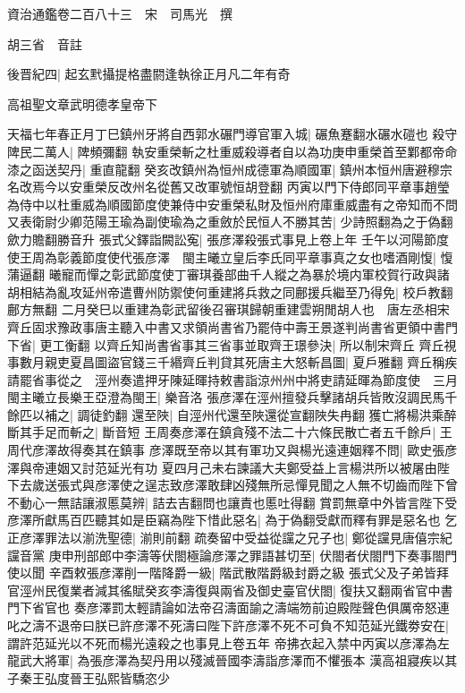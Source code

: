 資治通鑑卷二百八十三　宋　司馬光　撰

胡三省　音註

後晋紀四|{
	起玄黓攝提格盡閼逢執徐正月凡二年有奇}


高祖聖文章武明德孝皇帝下

天福七年春正月丁巳鎮州牙將自西郭水碾門導官軍入城|{
	碾魚蹇翻水碾水磑也}
殺守陴民二萬人|{
	陴頻彌翻}
執安重榮斬之杜重威殺導者自以為功庚申重榮首至鄴都帝命漆之函送契丹|{
	重直龍翻}
癸亥改鎮州為恒州成德軍為順國軍|{
	鎮州本恒州唐避穆宗名改焉今以安重榮反改州名從舊又改軍號恒胡登翻}
丙寅以門下侍郎同平章事趙瑩為侍中以杜重威為順國節度使兼侍中安重榮私財及恒州府庫重威盡有之帝知而不問又表衛尉少卿范陽王瑜為副使瑜為之重斂於民恒人不勝其苦|{
	少詩照翻為之于偽翻歛力贍翻勝音升}
張式父鐸詣闕訟寃|{
	張彦澤殺張式事見上卷上年}
壬午以河陽節度使王周為彰義節度使代張彦澤　閩主曦立皇后李氏同平章事真之女也嗜酒剛愎|{
	愎蒲逼翻}
曦寵而憚之彰武節度使丁審琪養部曲千人縱之為暴於境内軍校賀行政與諸胡相結為亂攻延州帝遣曹州防禦使何重建將兵救之同鄜援兵繼至乃得免|{
	校戶教翻鄜方無翻}
二月癸巳以重建為彰武留後召審琪歸朝重建雲朔閒胡人也　唐左丞相宋齊丘固求豫政事唐主聽入中書又求領尚書省乃罷侍中壽王景遂判尚書省更領中書門下省|{
	更工衡翻}
以齊丘知尚書省事其三省事並取齊王璟參決|{
	所以制宋齊丘}
齊丘視事數月親吏夏昌圖盜官錢三千緡齊丘判貸其死唐主大怒斬昌圖|{
	夏戶雅翻}
齊丘稱疾請罷省事從之　涇州奏遣押牙陳延暉持敕書詣涼州州中將吏請延暉為節度使　三月閩主曦立長樂王亞澄為閩王|{
	樂音洛}
張彦澤在涇州擅發兵擊諸胡兵皆敗沒調民馬千餘匹以補之|{
	調徒釣翻}
還至陜|{
	自涇州代還至陜還從宣翻陜失冉翻}
獲亡將楊洪乘醉斷其手足而斬之|{
	斷音短}
王周奏彦澤在鎮貪殘不法二十六條民散亡者五千餘戶|{
	王周代彦澤故得奏其在鎮事}
彦澤既至帝以其有軍功又與楊光遠連姻釋不問|{
	歐史張彦澤與帝連姻又討范延光有功}
夏四月己未右諫議大夫鄭受益上言楊洪所以被屠由陛下去歲送張式與彦澤使之逞志致彦澤敢肆凶殘無所忌憚見聞之人無不切齒而陛下曾不動心一無詰讓淑慝莫辨|{
	詰去吉翻問也讓責也慝吐得翻}
賞罰無章中外皆言陛下受彦澤所獻馬百匹聽其如是臣竊為陛下惜此惡名|{
	為于偽翻受獻而釋有罪是惡名也}
乞正彦澤罪法以湔洗聖德|{
	湔則前翻}
疏奏留中受益從讜之兄子也|{
	鄭從讜見唐僖宗紀讜音黨}
庚申刑部郎中李濤等伏閤極論彦澤之罪語甚切至|{
	伏閤者伏閤門下奏事閤門使以聞}
辛酉敕張彦澤削一階降爵一級|{
	階武散階爵級封爵之級}
張式父及子弟皆拜官涇州民復業者減其徭賦癸亥李濤復與兩省及御史臺官伏閤|{
	復扶又翻兩省官中書門下省官也}
奏彦澤罰太輕請論如法帝召濤面諭之濤端笏前迫殿陛聲色俱厲帝怒連叱之濤不退帝曰朕已許彦澤不死濤曰陛下許彦澤不死不可負不知范延光鐵劵安在|{
	謂許范延光以不死而楊光遠殺之也事見上卷五年}
帝拂衣起入禁中丙寅以彦澤為左龍武大將軍|{
	為張彦澤為契丹用以殘滅晉國李濤詣彦澤而不懼張本}
漢高祖寢疾以其子秦王弘度晉王弘熙皆驕恣少

